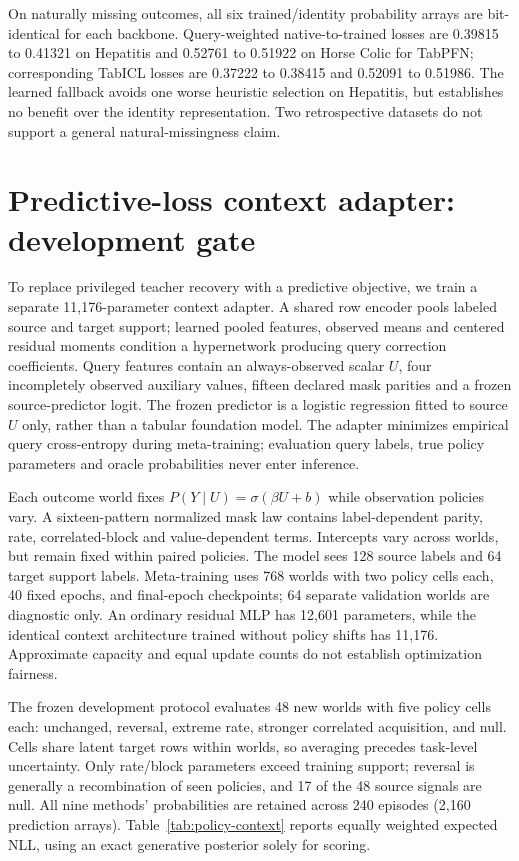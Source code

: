 \documentclass[10pt]{article}
\begin{document}
On naturally missing outcomes, all six trained/identity probability arrays are bit-identical for each backbone. Query-weighted native-to-trained losses are 0.39815 to 0.41321 on Hepatitis and 0.52761 to 0.51922 on Horse Colic for TabPFN; corresponding TabICL losses are 0.37222 to 0.38415 and 0.52091 to 0.51986. The learned fallback avoids one worse heuristic selection on Hepatitis, but establishes no benefit over the identity representation. Two retrospective datasets do not support a general natural-missingness claim.

\section{Predictive-loss context adapter: development gate}
To replace privileged teacher recovery with a predictive objective, we train a separate 11,176-parameter context adapter. A shared row encoder pools labeled source and target support; learned pooled features, observed means and centered residual moments condition a hypernetwork producing query correction coefficients. Query features contain an always-observed scalar $U$, four incompletely observed auxiliary values, fifteen declared mask parities and a frozen source-predictor logit. The frozen predictor is a logistic regression fitted to source $U$ only, rather than a tabular foundation model. The adapter minimizes empirical query cross-entropy during meta-training; evaluation query labels, true policy parameters and oracle probabilities never enter inference.

Each outcome world fixes $P(Y\mid U)=\sigma(\beta U+b)$ while observation policies vary. A sixteen-pattern normalized mask law contains label-dependent parity, rate, correlated-block and value-dependent terms. Intercepts vary across worlds, but remain fixed within paired policies. The model sees 128 source labels and 64 target support labels. Meta-training uses 768 worlds with two policy cells each, 40 fixed epochs, and final-epoch checkpoints; 64 separate validation worlds are diagnostic only. An ordinary residual MLP has 12,601 parameters, while the identical context architecture trained without policy shifts has 11,176. Approximate capacity and equal update counts do not establish optimization fairness.

The frozen development protocol evaluates 48 new worlds with five policy cells each: unchanged, reversal, extreme rate, stronger correlated acquisition, and null. Cells share latent target rows within worlds, so averaging precedes task-level uncertainty. Only rate/block parameters exceed training support; reversal is generally a recombination of seen policies, and 17 of the 48 source signals are null. All nine methods' probabilities are retained across 240 episodes (2,160 prediction arrays). Table~\ref{tab:policy-context} reports equally weighted expected NLL, using an exact generative posterior solely for scoring.
\end{document}
